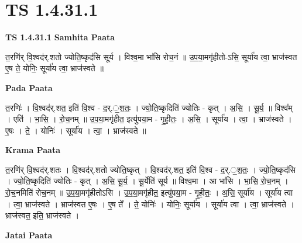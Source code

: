 \documentclass[17pt]{extarticle}
\begin{document}
\section*{ TS 1.4.31.1 }

\textbf{TS 1.4.31.1 } \newline
\textbf{Samhita Paata} \newline

त॒रणि॑र् वि॒श्वद॑र्.शतो ज्योति॒ष्कृद॑सि सूर्य । विश्व॒मा भा॑सि रोच॒नं ॥ उ॒प॒या॒मगृ॑हीतो-ऽसि॒ सूर्या॑य त्वा॒ भ्राज॑स्वत ए॒ष ते॒ योनिः॒ सूर्या॑य त्वा॒ भ्राज॑स्वते ॥ \newline

\textbf{Pada Paata} \newline

त॒रणिः॑ । वि॒श्वद॑र्.शत॒ इति॑ वि॒श्व - द॒र्.॒श॒तः॒ । ज्यो॒ति॒ष्कृदिति॑ ज्योतिः - कृत् । अ॒सि॒ । सू॒र्य॒ ॥ विश्व᳚म् । एति॑ । भा॒सि॒ । रो॒च॒नम् ॥ उ॒प॒या॒मगृ॑हीत॒ इत्यु॑पया॒म - गृ॒ही॒तः॒ । अ॒सि॒ । सूर्या॑य । त्वा॒ । भ्राज॑स्वते । ए॒षः । ते॒ । योनिः॑ । सूर्या॑य । त्वा॒ । भ्राज॑स्वते ॥  \newline


\textbf{Krama Paata} \newline

त॒रणि॑र् वि॒श्वद॑र्.शतः । वि॒श्वद॑र्.शतो ज्योति॒ष्कृत् । वि॒श्वद॑र्.शत॒ इति॑ वि॒श्व - द॒र्.॒श॒तः॒ । ज्यो॒ति॒ष्कृद॑सि । ज्यो॒ति॒ष्कृदिति॑ ज्योतिः - कृत् । अ॒सि॒ सू॒र्य॒ । सू॒र्येति॑ सूर्य ॥ विश्व॒मा । आ भा॑सि । भा॒सि॒ रो॒च॒नम् । रो॒च॒नमिति॑ रोच॒नम् ॥ उ॒प॒या॒मगृ॑हीतोऽसि । उ॒प॒या॒मगृ॑हीत॒ इत्यु॑पया॒म - गृ॒ही॒तः॒ । अ॒सि॒ सूर्या॑य । सूर्या॑य त्वा । त्वा॒ भ्राज॑स्वते । भ्राज॑स्वत ए॒षः । ए॒ष ते᳚ । ते॒ योनिः॑ । योनिः॒ सूर्या॑य । सूर्या॑य त्वा । त्वा॒ भ्राज॑स्वते । भ्राज॑स्वत॒ इति॒ भ्राज॑स्वते । \newline

\textbf{Jatai Paata} \newline
\end{document}
